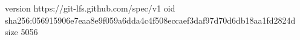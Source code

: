 version https://git-lfs.github.com/spec/v1
oid sha256:056915906e7eaa8e9f059a6dda4c4f508eccaef3daf97d70d6db18aa1fd2824d
size 5056
